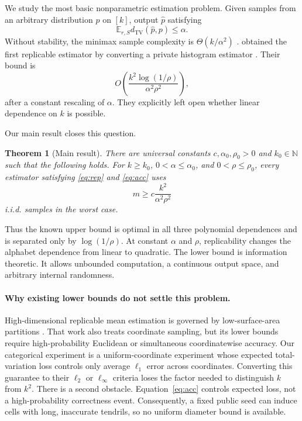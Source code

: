 \documentclass[twoside]{article}
\newtheorem{theorem}{Theorem}
\theoremstyle{definition}
\newcommand{\E}{\mathbb E}
\newcommand{\TV}{d_{\mathrm{TV}}}
\newcommand{\1}{\mathbf 1}
\begin{document}
We study the most basic nonparametric estimation problem. Given samples from an arbitrary distribution $p$ on $[k]$, output $\widehat p$ satisfying
\begin{equation}
 \E_{r,S}\TV(\widehat p,p)\le \alpha .
 \label{eq:acc}
\end{equation}
Without stability, the minimax sample complexity is $\Theta(k/\alpha^2)$ \citep{devroye2001}. \citet{bun2023} obtained the first replicable estimator by converting a private histogram estimator \citep{diakonikolas2015,acharya2021}. Their bound is
\begin{equation}
 O\!\left(\frac{k^2\log(1/\rho)}{\alpha^2\rho^2}\right),
 \label{eq:upper}
\end{equation}
after a constant rescaling of $\alpha$. They explicitly left open whether linear dependence on $k$ is possible.

Our main result closes this question.

\begin{theorem}[Main result]\label{thm:main}
There are universal constants $c,\alpha_0,\rho_0>0$ and $k_0\in\mathbb N$ such that the following holds. For $k\ge k_0$, $0<\alpha\le\alpha_0$, and $0<\rho\le\rho_0$, every estimator satisfying \eqref{eq:rep} and \eqref{eq:acc} uses
\begin{equation}
 m\ge c\frac{k^2}{\alpha^2\rho^2}
 \label{eq:lower}
\end{equation}
i.i.d. samples in the worst case.
\end{theorem}

Thus the known upper bound is optimal in all three polynomial dependences and is separated only by $\log(1/\rho)$. At constant $\alpha$ and $\rho$, replicability changes the alphabet dependence from linear to quadratic. The lower bound is information theoretic. It allows unbounded computation, a continuous output space, and arbitrary internal randomness.

\paragraph{Why existing lower bounds do not settle this problem.}
High-dimensional replicable mean estimation is governed by low-surface-area partitions \citep{hopkins2024}. That work also treats coordinate sampling, but its lower bounds require high-probability Euclidean or simultaneous coordinatewise accuracy. Our categorical experiment is a uniform-coordinate experiment whose expected total-variation loss controls only average $\ell_1$ error across coordinates. Converting this guarantee to their $\ell_2$ or $\ell_\infty$ criteria loses the factor needed to distinguish $k$ from $k^2$. There is a second obstacle. Equation~\eqref{eq:acc} controls expected loss, not a high-probability correctness event. Consequently, a fixed public seed can induce cells with long, inaccurate tendrils, so no uniform diameter bound is available.
\end{document}
